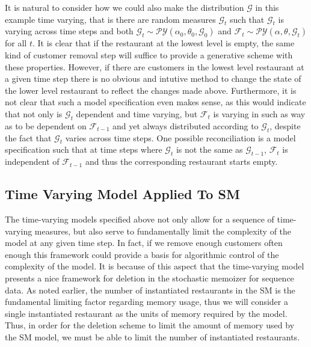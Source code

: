 \documentclass{article}
\newcommand{\F}{\mathcal{F}}
\newcommand{\PY}{\mathcal{P}\mathcal{Y}}
\newcommand{\G}{\mathcal{G}}
\begin{document}
It is natural to consider how we could also make the distribution $\G$ in this example time varying, that is there are random measures $\G_t$ such that $\G_t$ is varying across time steps and both $\G_t \sim \PY(\alpha_0, \theta_0, \G_0)$ and $\F_t \sim \PY(\alpha,\theta,\G_t)$ for all $t$.  It is clear that if the restaurant at the lowest level is empty, the same kind of customer removal step will suffice to provide a generative scheme with these properties.  However, if there are customers in the lowest level restaurant at a given time step there is no obvious and intutive method to change the state of the lower level restaurant to reflect the changes made above. Furthermore, it is not clear that such a model specification even makes sense, as this would indicate that not only is $\G_t$ dependent and time varying, but $\F_t$ is varying in such as way as to be dependent on $\F_{t-1}$ and yet always distributed according to $\G_t$, despite the fact that $\G_t$ varies across time steps.  One possible reconciliation is a model specification such that at time steps where $\G_t$ is not the same as $\G_{t-1}$, $\F_t$ is independent of $\F_{t-1}$ and thus the corresponding restaurant starts empty.

\subsection{Time Varying Model Applied To SM}

The time-varying models specified above not only allow for a sequence of time-varying measures, but also serve to fundamentally limit the complexity of the model at any given time step.  In fact, if we remove enough customers often enough this framework could provide a basis for algorithmic control of the complexity of the model.  It is because of this aspect that the time-varying model presents a nice framework for deletion in the stochastic memoizer for sequence data.  As noted earlier, the number of instantiated restaurants in the SM is the fundamental limiting factor regarding memory usage, thus we will consider a single instantiated restaurant as the units of memory required by the model.  Thus, in order for the deletion scheme to limit the amount of memory used by the SM model, we must be able to limit the number of instantiated restaurants.
\end{document}
